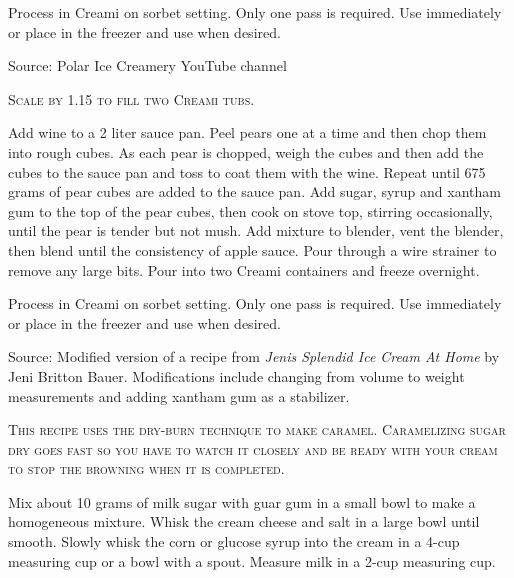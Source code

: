 \documentclass[letterpaper]{recipePMG}
\newcommand{\headnote}{\textsc}
\begin{document}
Process in Creami on sorbet setting.  Only one pass is required.  Use immediately or place in the freezer and use when desired.

Source: Polar Ice Creamery YouTube channel

\label{PearRieslingSorbet}

\headnote{Scale by 1.15 to fill two Creami tubs.}



Add wine to a 2 liter sauce pan. Peel pears one at a time and then chop them into rough cubes.  As each pear is chopped, weigh the cubes and then add the cubes to the sauce pan and toss to coat them with the wine. Repeat until 675 grams of pear cubes are added to the sauce pan. Add sugar, syrup and xantham gum to the top of the pear cubes, then cook on stove top, stirring occasionally, until the pear is tender but not mush.  Add mixture to blender, vent the blender, then blend until the consistency of apple sauce. Pour through a wire strainer to remove any large bits.  Pour into two Creami containers and freeze overnight.  

Process in Creami on sorbet setting.  Only one pass is required.  Use immediately or place in the freezer and use when desired.

Source: Modified version of a recipe from \textit{Jenis Splendid Ice Cream At Home} by Jeni Britton Bauer. Modifications include changing from volume to weight measurements and adding xantham gum as a stabilizer.

\newpage
{}
\headnote{This recipe uses the dry-burn technique to make caramel. Caramelizing sugar dry goes fast so you have to watch it closely and be ready with your cream to stop the browning when it is completed.}


Mix about 10 grams of milk sugar with guar gum in a small bowl to make a homogeneous mixture. Whisk the cream cheese and salt in a large bowl until smooth. Slowly whisk the corn or glucose syrup into the cream in a 4-cup measuring cup or a bowl with a spout.  Measure milk in a 2-cup measuring cup.
\end{document}
